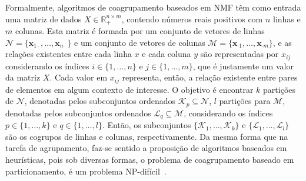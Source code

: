 \documentclass[
    12pt,                %
    oneside,            %
    a4paper,            %
    english,            %
    brazil                %
    ]{abntex2ppgsi}
\begin{document}
Formalmente, algoritmos de coagrupamento baseados em NMF têm como entrada uma matriz de dados $X \in \mathbb{R}^{n \times m}_{+}$, contendo números reais positivos com $n$ linhas e $m$ colunas.
Esta matriz é formada por um conjunto de vetores de linhas $\mathcal{N} = \{ \mathbf{x}_{1 \cdot}, \dots, \mathbf{x}_{n \cdot} \}$ e um conjunto de vetores de colunas $\mathcal{M} = \{ \mathbf{x}_{\cdot 1}, \dots, \mathbf{x}_{\cdot m} \}$, e as relações existentes entre cada linha $x$ e cada coluna $y$ são representadas por $x_{ij}$ considerando os índices $i \in \{1, \dots, n\}$ e $j \in \{1, \dots, m\}$, que é justamente um valor da matriz $X$.
Cada valor em $x_{ij}$ representa, então, a relação existente entre pares de elementos em algum contexto de interesse.
O objetivo é encontrar $k$ partições de $\mathcal{N}$, denotadas pelos subconjuntos ordenados $\mathcal{K}_p \subseteq \mathcal{N}$, $l$ partições para $\mathcal{M}$, denotadas pelos subconjuntos ordenados $\mathcal{L}_q \subseteq \mathcal{M}$, considerando os índices $p \in \{ 1, \dots, k\}$ e $q \in \{1, \dots, l\}$.
Então, os subconjuntos $\{\mathcal{K}_1, \dots, \mathcal{K}_k\}$ e $\{\mathcal{L}_1, \dots, \mathcal{L}_l\}$ são os cogrupos de linhas e colunas, respectivamente.
Da mesma forma que na tarefa de agrupamento, faz-se sentido a proposição de algoritmos baseados em heurísticas, pois sob diversas formas, o problema de coagrupamento baseado em particionamento, é um problema NP-difícil~\cite{Bulteau2014}.


\end{document}
